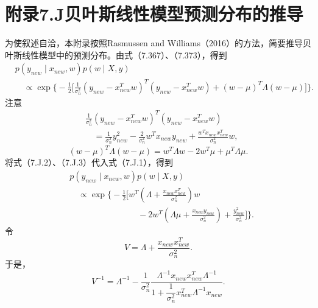 \section*{附录7.J\quad 贝叶斯线性模型预测分布的推导}

为使叙述自洽，本附录按照Rasmussen and Williams（2016）的方法，简要推导贝叶斯线性模型中的预测分布。由式（7.367）、（7.373），得到
\begin{equation}
\begin{aligned}
&p(y_{new}\mid x_{new},w)p(w\mid X,y)\\
&\quad\propto\exp\biggl\{-\frac12\biggl[
 \frac1{\sigma_n^2}(y_{new}-x_{new}^Tw)^T(y_{new}-x_{new}^Tw)
 +(w-\mu)^T\Lambda(w-\mu)\biggr]\biggr\}.
\end{aligned}\tag{7.J.1}
\end{equation}
注意
\begin{equation}
\begin{aligned}
&\frac1{\sigma_n^2}(y_{new}-x_{new}^Tw)^T(y_{new}-x_{new}^Tw)\\
&\quad=\frac1{\sigma_n^2}y_{new}^2-\frac2{\sigma_n^2}w^Tx_{new}y_{new}
 +\frac{w^Tx_{new}x_{new}^T}{\sigma_n^2}w,
\end{aligned}\tag{7.J.2}
\end{equation}
\begin{equation}
(w-\mu)^T\Lambda(w-\mu)=w^T\Lambda w-2w^T\mu+\mu^T\Lambda\mu.\tag{7.J.3}
\end{equation}
将式（7.J.2）、（7.J.3）代入式（7.J.1），得到
\begin{equation}
\begin{aligned}
&p(y_{new}\mid x_{new},w)p(w\mid X,y)\\
&\quad\propto\exp\biggl\{-\frac12\biggl[
 w^T\left(\Lambda+\frac{x_{new}x_{new}^T}{\sigma_n^2}\right)w\\
&\hspace{8em}{}-2w^T\left(\Lambda\mu+\frac{x_{new}y_{new}}{\sigma_n^2}\right)
 +\frac{y_{new}^2}{\sigma_n^2}\biggr]\biggr\}.
\end{aligned}\tag{7.J.4}
\end{equation}
令
\begin{equation}
V=\Lambda+\frac{x_{new}x_{new}^T}{\sigma_n^2}.\tag{7.J.5}
\end{equation}
于是，
\begin{equation}
V^{-1}=\Lambda^{-1}-\frac1{\sigma_n^2}
 \frac{\Lambda^{-1}x_{new}x_{new}^T\Lambda^{-1}}
 {1+\dfrac1{\sigma_n^2}x_{new}^T\Lambda^{-1}x_{new}}.\tag{7.J.6}
\end{equation}
